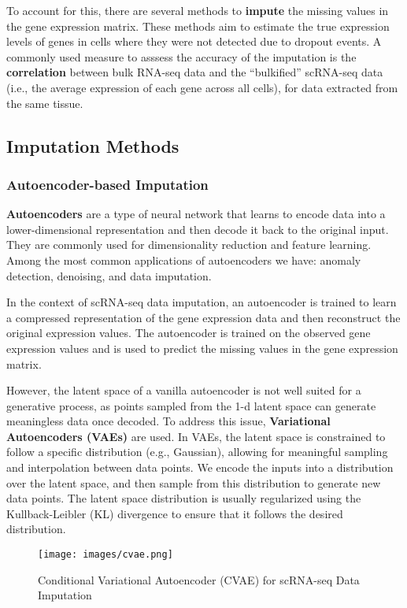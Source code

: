 \documentclass[a4paper]{article}
\begin{document}
To account for this, there are several methods to \textbf{impute} the missing
values in the gene expression matrix. These methods aim to estimate the true
expression levels of genes in cells where they were not detected due to dropout
events. A commonly used measure to asssess the accuracy of the imputation is
the \textbf{correlation} between bulk RNA-seq data and the ``bulkified'' 
scRNA-seq data (i.e., the average expression of each gene across all cells),
for data extracted from the same tissue.

\subsection*{Imputation Methods}

\subsubsection*{Autoencoder-based Imputation}

\textbf{Autoencoders} are a type of neural network that learns to encode
data into a lower-dimensional representation and then decode it back to
the original input. They are commonly used for dimensionality reduction
and feature learning. Among the most common applications of autoencoders
we have: anomaly detection, denoising, and data imputation.

In the context of scRNA-seq data imputation, an autoencoder is trained
to learn a compressed representation of the gene expression data and
then reconstruct the original expression values. The autoencoder is
trained on the observed gene expression values and is used to predict
the missing values in the gene expression matrix.

However, the latent space of a vanilla autoencoder is not well suited
for a generative process, as points sampled from the 1-d latent space
can generate meaningless data once decoded. To address this issue,
\textbf{Variational Autoencoders (VAEs)} are used. In VAEs,
the latent space is constrained to follow a specific distribution
(e.g., Gaussian), allowing for meaningful sampling and interpolation
between data points. We encode the inputs into a distribution
over the latent space, and then sample from this distribution to
generate new data points. The latent space distribution is usually
regularized using the Kullback-Leibler (KL) divergence to ensure
that it follows the desired distribution.

\begin{figure}[H]
  \centering
  \texttt{[image: images/cvae.png]}
  \caption{Conditional Variational Autoencoder (CVAE) for scRNA-seq Data Imputation}
\end{figure}
\end{document}
